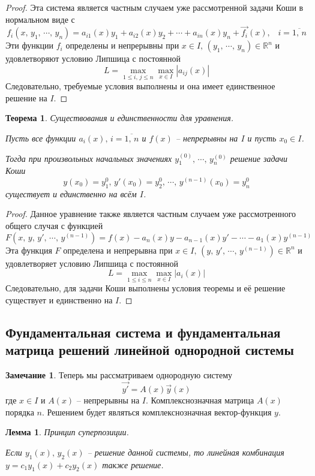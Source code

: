 \documentclass[a4paper,12pt]{article}
\renewcommand{\leq}{\ensuremath{\leqslant}}
\theoremstyle{plain}
\newtheorem{theorem}{Теорема}[section]
\newtheorem{lemma}{Лемма}[section]
\theoremstyle{definition}
\newtheorem*{note}{Замечание}
\theoremstyle{remark}
\begin{document}
\begin{proof}
	Эта система является частным случаем уже рассмотренной задачи Коши в нормальном виде с
	\[f_i(x,\, y_1,\,\cdots,\,y_n) = a_{i1}(x)y_1 + a_{i2}(x)y_2+\cdots+a_{in}(x)y_n + \vec{f_i}(x),\;\;\; i = \overline{1,\,n}\]
	Эти функции $f_i$ определены и непрерывны при $x \in I,\, (y_1,\,\cdots,\,y_n)\in \mathbb{R}^n$ и удовлетворяют условию Липшица с постоянной
	\[L = \max_{1\leq i,\,j \leq n}\max_{x \in I}|a_{ij}(x)|\]
	Следовательно, требуемые условия выполнены и она имеет единственное решение на $I$.
\end{proof}

\begin{theorem}
	Существования и единственности для уравнения.

	Пусть все функции $a_i(x),\, i = \overline{1,\,n}$ и $f(x)$ -- непрерывны на $I$ и пусть $x_0 \in I$.

	Тогда при произвольных начальных значениях $y_1^{(0)},\, \cdots,\, y_n^{(0)}$ решение задачи Коши
	\[y(x_0) = y_1^0,\, y'(x_0) = y_2^0,\,\cdots,\,y^{(n-1)}(x_0) = y_n^0\]
	существует и единственно на всём $I$.
\end{theorem}

\begin{proof}
	Данное уравнение также является частным случаем уже рассмотренного общего случая с функцией
	\[F(x,\,y,\,y',\,\cdots,\,y^{(n-1)}) = f(x) - a_n(x)y - a_{n-1}(x)y' - \cdots - a_1(x)y^{(n-1)}\]
	Эта функция $F$ определена и непрерывна при $x \in I,\, (y,\, y',\,\cdots,\,y^{(n-1)})\in\mathbb{R}^n$ и удовлетворяет условию Липшица с постоянной
	\[L = \max_{1\leq i \leq n}\max_{x \in I} |a_i(x)|\]
	Следовательно, для задачи Коши выполнены условия теоремы и её решение существует и единственно на $I$.
\end{proof}

\subsection{Фундаментальная система и фундаментальная матрица решений линейной однородной системы}
\begin{note}
	Теперь мы рассматриваем однородную систему
	\[\vec{y'} = A(x)\vec{y}(x)\]
	где $x \in I$ и $A(x)$ -- непрерывны на $I$. Комплекснозначная матрица $A(x)$ порядка $n$. Решением будет являться комплекснозначная вектор-функция $y$.
\end{note}

\begin{lemma}
	Принцип суперпозиции.

	Если $y_1(x),\, y_2(x)$ -- решение данной системы, то линейная комбинация $y = c_1y_1(x) + c_2y_2(x)$ также решение.
\end{lemma}
\end{document}

